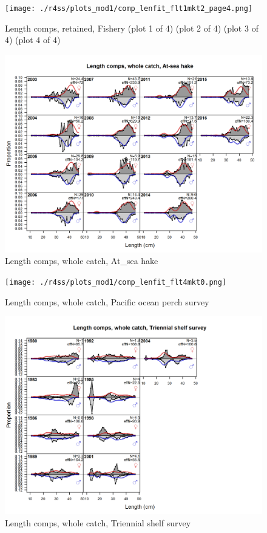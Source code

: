 \documentclass[12pt,]{article}
\begin{document}
\begin{figure}
\centering
\texttt{[image: ./r4ss/plots\_mod1/comp\_lenfit\_flt1mkt2\_page4.png]}
\caption{Length comps, retained, Fishery (plot 1 of 4) (plot 2 of 4)
(plot 3 of 4) (plot 4 of 4) \label{fig:length_fits}}
\end{figure}

\begin{figure}
\centering
\includegraphics{./r4ss/plots_mod1/comp_lenfit_flt2mkt0.png}
\caption{Length comps, whole catch, At\_sea hake
\label{fig:length_fits}}
\end{figure}

\begin{figure}
\centering
\texttt{[image: ./r4ss/plots\_mod1/comp\_lenfit\_flt4mkt0.png]}
\caption{Length comps, whole catch, Pacific ocean perch survey
\label{fig:length_fits}}
\end{figure}

\begin{figure}
\centering
\includegraphics{./r4ss/plots_mod1/comp_lenfit_flt5mkt0.png}
\caption{Length comps, whole catch, Triennial shelf survey
\label{fig:length_fits}}
\end{figure}
\end{document}
